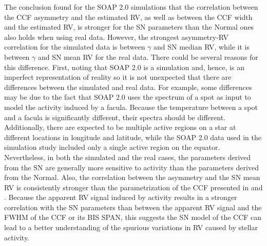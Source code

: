 \documentclass{aa}
\newcommand{\jessi}[1]{{\color{Purple}[[\textbf{Jessi: }#1]]}}
\newcommand{\xavier}[1]{{\color{blue}[[\textbf{Xavier: }#1]]}}
\newcommand{\umberto}[1]{{\color{green}[[\textbf{Umberto: }#1]]}}
\begin{document}
The conclusion found for the SOAP 2.0 simulations that the correlation between the CCF asymmetry and the estimated RV, as well as between the CCF width and the estimated RV, is stronger for the SN parameters than the Normal ones also holds when using real data.
%
However, the strongest asymmetry-RV correlation for the simulated data is between $\gamma$ and SN median RV, while it is between $\gamma$ and SN mean RV for the real data.
There could be several reasons for this difference. 
First, noting that SOAP 2.0 is a simulation and, hence, is an imperfect representation of reality so it is not unexpected that there are differences between the simulated and real data.
For example, some differences may be due to the fact that SOAP 2.0 uses the spectrum of a spot as input to model the activity induced by a facula.
Because the temperature between a spot and a facula is significantly different, their spectra should be different. 
Additionally, there are expected to be multiple active regions on a star at different locations in longitude and latitude, while the SOAP 2.0 data used in the simulation study included only a single active region on the equator. 
Nevertheless, in both the simulated and the real cases, the parameters derived from the SN are generally more sensitive to activity than the parameters derived from the Normal.  Also, the correlation between the asymmetry and the SN mean RV is consistently stronger than the parametrization of the CCF presented in \citet{Boisse-2011} and \citet{Figueira-2013}. 
Because the apparent RV signal induced by activity  
results in a stronger correlation with the SN parameters
than between the apparent RV signal and the FWHM of the CCF or its BIS SPAN, this suggests the SN model of the CCF can lead to a better understanding of the spurious variations in RV caused by stellar activity.
\end{document}
